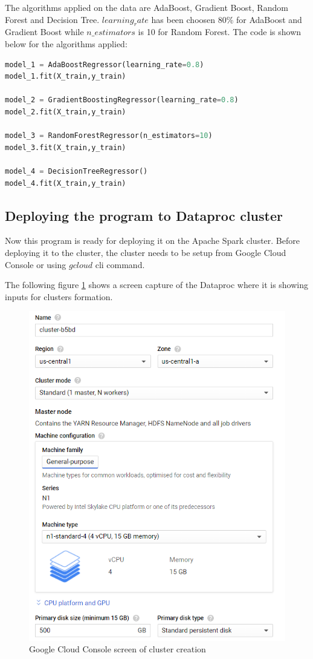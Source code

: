 \documentclass[journal,twoside,web]{ieeecolor}
\begin{document}
The algorithms applied on the data are AdaBoost, Gradient Boost, Random Forest and Decision Tree. $learning_rate$ has been choosen 80\% for AdaBoost and Gradient Boost while $n\_estimators$ is 10 for Random Forest. The code is shown below for the algorithms applied:

\begin{lstlisting}[language=Python]
model_1 = AdaBoostRegressor(learning_rate=0.8)
model_1.fit(X_train,y_train)

model_2 = GradientBoostingRegressor(learning_rate=0.8)
model_2.fit(X_train,y_train)

model_3 = RandomForestRegressor(n_estimators=10)
model_3.fit(X_train,y_train)

model_4 = DecisionTreeRegressor()
model_4.fit(X_train,y_train)
\end{lstlisting}

\subsection{Deploying the program to Dataproc cluster}
Now this program is ready for deploying it on the Apache Spark cluster. Before deploying it to the cluster, the cluster needs to be setup from Google Cloud Console or using $gcloud$ cli command.

The following figure \ref{fig:2} shows a screen capture of the Dataproc where it is showing inputs for clusters formation.
\begin{figure}[h]
    \centering
    \includegraphics[scale=0.65]{images/cluster_1.png}
    \caption{Google Cloud Console screen of cluster creation}
    \label{fig:2}
\end{figure}
\end{document}
